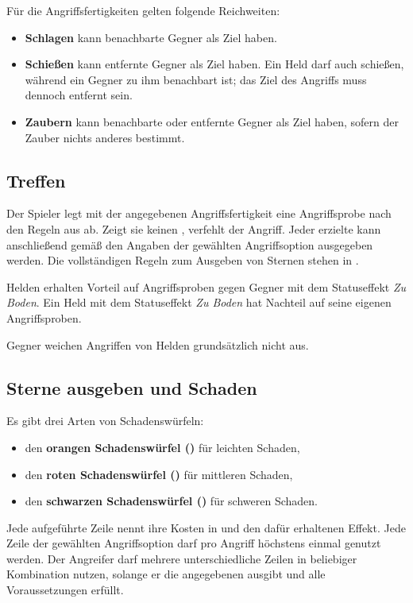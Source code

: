 Für die Angriffsfertigkeiten gelten folgende Reichweiten:

\begin{itemize}
  \item \textbf{Schlagen} kann benachbarte Gegner als Ziel haben.
  \item \textbf{Schießen} kann entfernte Gegner als Ziel haben. Ein Held darf auch schießen, während ein Gegner zu ihm benachbart ist; das Ziel des Angriffs muss dennoch entfernt sein.
  \item \textbf{Zaubern} kann benachbarte oder entfernte Gegner als Ziel haben, sofern der Zauber nichts anderes bestimmt.
\end{itemize}

\subsection{Treffen}

Der Spieler legt mit der angegebenen Angriffsfertigkeit eine Angriffsprobe nach den Regeln aus  ab. Zeigt sie keinen \star, verfehlt der Angriff. Jeder erzielte \star{} kann anschließend gemäß den Angaben der gewählten Angriffsoption ausgegeben werden. Die vollständigen Regeln zum Ausgeben von Sternen stehen in .

Helden erhalten Vorteil auf Angriffsproben gegen Gegner mit dem Statuseffekt \emph{Zu Boden}. Ein Held mit dem Statuseffekt \emph{Zu Boden} hat Nachteil auf seine eigenen Angriffsproben.

Gegner weichen Angriffen von Helden grundsätzlich nicht aus.

\subsection{Sterne ausgeben und Schaden}

Es gibt drei Arten von Schadenswürfeln:

\begin{itemize}
  \item den \textbf{orangen Schadenswürfel (\orangeDmgDie)} für leichten Schaden,
  \item den \textbf{roten Schadenswürfel (\redDmgDie)} für mittleren Schaden,
  \item den \textbf{schwarzen Schadenswürfel (\blackDmgDie)} für schweren Schaden.
\end{itemize}

Jede aufgeführte Zeile nennt ihre Kosten in \star{} und den dafür erhaltenen Effekt. Jede Zeile der gewählten Angriffsoption darf pro Angriff höchstens einmal genutzt werden. Der Angreifer darf mehrere unterschiedliche Zeilen in beliebiger Kombination nutzen, solange er die angegebenen \star{} ausgibt und alle Voraussetzungen erfüllt.


